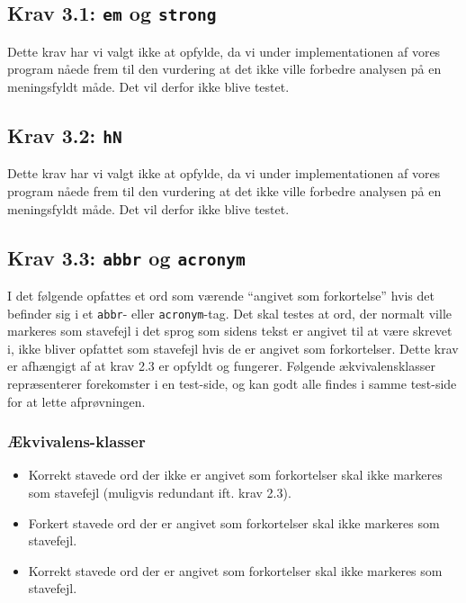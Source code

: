 \documentclass[a4paper,oneside,article]{memoir}
\begin{document}
\begin{landscape}
\subsection{Krav 3.1: \texttt{em} og \texttt{strong}}

Dette krav har vi valgt ikke at opfylde, da vi under implementationen
af vores program nåede frem til den vurdering at det ikke ville
forbedre analysen på en meningsfyldt måde. Det vil derfor ikke blive
testet.

\subsection{Krav 3.2: \texttt{hN}}

Dette krav har vi valgt ikke at opfylde, da vi under implementationen
af vores program nåede frem til den vurdering at det ikke ville
forbedre analysen på en meningsfyldt måde. Det vil derfor ikke blive
testet.

\subsection{Krav 3.3: \texttt{abbr} og \texttt{acronym}}

I det følgende opfattes et ord som værende ``angivet som forkortelse''
hvis det befinder sig i et \texttt{abbr}- eller
\texttt{acronym}-tag. Det skal testes at ord, der normalt ville
markeres som stavefejl i det sprog som sidens tekst er angivet til at
være skrevet i, ikke bliver opfattet som stavefejl hvis de er angivet
som forkortelser. Dette krav er afhængigt af at krav 2.3 er opfyldt og
fungerer. Følgende ækvivalensklasser repræsenterer forekomster i en
test-side, og kan godt alle findes i samme test-side for at lette
afprøvningen.

\subsubsection{Ækvivalens-klasser}
\begin{itemize}
\item Korrekt stavede ord der ikke er angivet som forkortelser skal
  ikke markeres som stavefejl (muligvis redundant ift. krav 2.3).
\item Forkert stavede ord der er angivet som forkortelser skal ikke
  markeres som stavefejl.
\item Korrekt stavede ord der er angivet som forkortelser skal ikke
  markeres som stavefejl.
\end{itemize}


\end{landscape}
\end{document}
